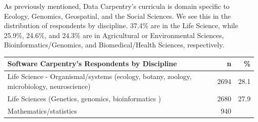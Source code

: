 \documentclass[]{article}
\begin{document}
As previously mentioned, Data Carpentry's curricula is domain specific
to Ecology, Genomics, Geospatial, and the Social Sciences. We see this
in the distribution of respondents by discipline. 37.4\% are in the Life
Science, while 25.9\%, 24.6\%, and 24.3\% are in Agricultural or
Environmental Sciences, Bioinformatics/Genomics, and Biomedical/Health
Sciences, respectively.

\begin{longtable}[]{@{}lrr@{}}
\toprule
\begin{minipage}[b]{0.81\columnwidth}\raggedright\strut
Software Carpentry's Respondents by Discipline\strut
\end{minipage} & \begin{minipage}[b]{0.05\columnwidth}\raggedleft\strut
n\strut
\end{minipage} & \begin{minipage}[b]{0.05\columnwidth}\raggedleft\strut
\%\strut
\end{minipage}\tabularnewline
\midrule
\endhead
\begin{minipage}[t]{0.81\columnwidth}\raggedright\strut
Life Science - Organismal/systems (ecology, botany, zoology,
microbiology, neuroscience)\strut
\end{minipage} & \begin{minipage}[t]{0.05\columnwidth}\raggedleft\strut
2694\strut
\end{minipage} & \begin{minipage}[t]{0.05\columnwidth}\raggedleft\strut
28.1\strut
\end{minipage}\tabularnewline
\begin{minipage}[t]{0.81\columnwidth}\raggedright\strut
Life Sciences (Genetics, genomics, bioinformatics )\strut
\end{minipage} & \begin{minipage}[t]{0.05\columnwidth}\raggedleft\strut
2680\strut
\end{minipage} & \begin{minipage}[t]{0.05\columnwidth}\raggedleft\strut
27.9\strut
\end{minipage}\tabularnewline
\begin{minipage}[t]{0.81\columnwidth}\raggedright\strut
Mathematics/statistics\strut
\end{minipage} & \begin{minipage}[t]{0.05\columnwidth}\raggedleft\strut
940\strut
\end{minipage} & \begin{minipage}[t]{0.05\columnwidth}\raggedleft\strut

\end{minipage}
\end{longtable}
\end{document}
